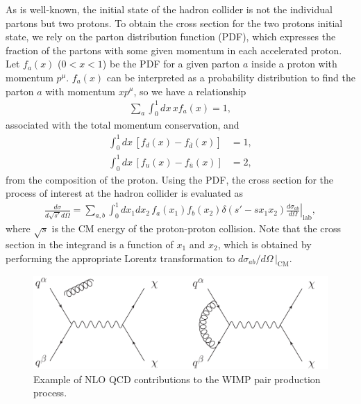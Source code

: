 \documentclass[12pt,twoside,book]{article}
\begin{document}
As is well-known, the initial state of the hadron collider is not the individual partons but two protons.
To obtain the cross section for the two protons initial state, we rely on the parton distribution function (PDF), which expresses the fraction of the partons with some given momentum in each accelerated proton.
Let $f_a (x)$ ($0 < x < 1$) be the PDF for a given parton $a$ inside a proton with momentum $p^\mu$.
$f_a (x)$ can be interpreted as a probability distribution to find the parton $a$ with momentum $x p^\mu$, so we have a relationship
\begin{align}
  \sum_a \int_0^1 dx \, x f_a (x) = 1,
\end{align}
associated with the total momentum conservation, and
\begin{align}
  \int_0^1 dx \, \left[ f_d (x) - f_{\bar{d}} (x) \right] &= 1,\\
  \int_0^1 dx \, \left[ f_u (x) - f_{\bar{u}} (x) \right] &= 2,
\end{align}
from the composition of the proton.
Using the PDF, the cross section for the process of interest at the hadron collider is evaluated as
\begin{align}
  \frac{d \sigma}{d \sqrt{s'} d \Omega} =
  \sum_{a,b} \int_0^1 dx_1 dx_2 \, f_a (x_1) f_b (x_2) \delta \left( s' - s x_1 x_2 \right)
  \left. \frac{d \sigma_{a b}}{d \Omega} \right|_{\text{lab}},
\end{align}
where $\sqrt{s}$ is the CM energy of the proton-proton collision.
Note that the cross section in the integrand is a function of $x_1$ and $x_2$, which is obtained by performing the appropriate Lorentz transformation to $\left. d \sigma_{a b} / d \Omega\, \right|_{\text{CM}}$.

\begin{figure}[t]
  \centering
  \includegraphics[width=0.8\hsize]{WIMP_production_NLO.pdf}
  \caption{Example of NLO QCD contributions to the WIMP pair production process.}
  \label{fig:WIMP_production_NLO}
\end{figure}
\end{document}
